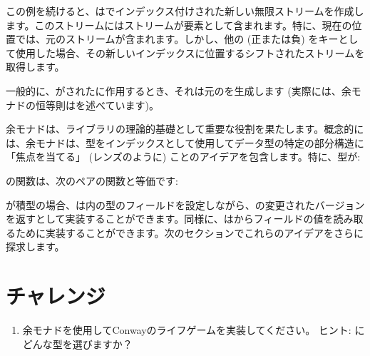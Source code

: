 この例を続けると、はでインデックス付けされた新しい無限ストリームを作成します。このストリームにはストリームが要素として含まれます。特に、現在の位置では、元のストリームが含まれます。しかし、他の (正または負) をキーとして使用した場合、その新しいインデックスに位置するシフトされたストリームを取得します。

一般的に、がされたに作用するとき、それは元のを生成します (実際には、余モナドの恒等則はを述べています)。

余モナドは、ライブラリの理論的基礎として重要な役割を果たします。概念的には、余モナドは、型をインデックスとして使用してデータ型の特定の部分構造に「焦点を当てる」 (レンズのように) ことのアイデアを包含します。特に、型が: 

の関数は、次のペアの関数と等価です: 

が積型の場合、は内の型のフィールドを設定しながら、の変更されたバージョンを返すとして実装することができます。同様に、はからフィールドの値を読み取るために実装することができます。次のセクションでこれらのアイデアをさらに探求します。

\section{チャレンジ}

\begin{enumerate}
  \tightlist
  \item
        余モナドを使用してConwayのライフゲームを実装してください。
        ヒント: にどんな型を選びますか？
\end{enumerate}


